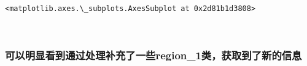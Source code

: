 \documentclass[11pt]{article}
\makeatletter
\newcommand{\boxspacing}{\kern\kvtcb@left@rule\kern\kvtcb@boxsep}
\newcommand{\prompt}[4]{
        {\ttfamily\llap{{\color{#2}[#3]:\hspace{3pt}#4}}\vspace{-\baselineskip}}
    }
\makeatother
\begin{document}
            \begin{tcolorbox}[breakable, size=fbox, boxrule=.5pt, pad at break*=1mm, opacityfill=0]
\prompt{Out}{outcolor}{55}{\boxspacing}
\begin{Verbatim}[commandchars=\\\{\}]
<matplotlib.axes.\_subplots.AxesSubplot at 0x2d81b1d3808>
\end{Verbatim}
\end{tcolorbox}
        
    \begin{center}
    \end{center}
    { \hspace*{\fill} \\}
    
    \hypertarget{ux53efux4ee5ux660eux663eux770bux5230ux901aux8fc7ux5904ux7406ux8865ux5145ux4e86ux4e00ux4e9bregion_1ux7c7bux83b7ux53d6ux5230ux4e86ux65b0ux7684ux4fe1ux606f}{%
\subsubsection{可以明显看到通过处理补充了一些region\_1类，获取到了新的信息}\label{ux53efux4ee5ux660eux663eux770bux5230ux901aux8fc7ux5904ux7406ux8865ux5145ux4e86ux4e00ux4e9bregion_1ux7c7bux83b7ux53d6ux5230ux4e86ux65b0ux7684ux4fe1ux606f}}


    
    
    
\end{document}
